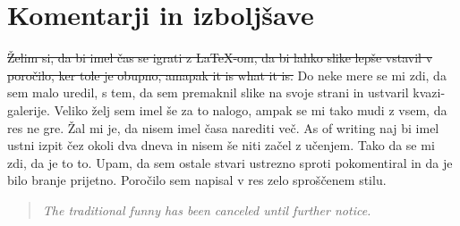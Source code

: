 \documentclass[a4paper]{article}
\begin{document}
\section{Komentarji in izboljšave}
\st{Želim si, da bi imel čas se igrati z LaTeX-om, da bi lahko slike lepše vstavil v poročilo, ker tole 
je obupno, amapak it is what it is.} Do neke mere se mi zdi, da sem malo uredil, s tem, da sem premaknil slike 
na svoje strani in ustvaril kvazi-galerije. Veliko želj sem imel še za to nalogo, ampak se mi tako mudi z vsem,
da res ne gre. Žal mi je, da nisem imel časa narediti več. As of writing naj bi imel ustni izpit čez okoli
dva dneva in nisem še niti začel z učenjem. Tako da se mi zdi, da je to to. Upam, da sem ostale stvari
ustrezno sproti pokomentiral in da je bilo branje prijetno. Poročilo sem napisal v res zelo sproščenem
stilu.

\begin{quotation}
    \centering
    \textit{The traditional funny has been canceled until further notice.}
\end{quotation}


%
%
\end{document}
